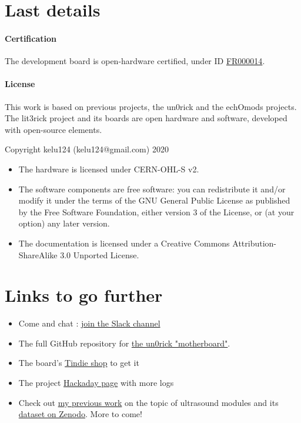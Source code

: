 \documentclass{article}
\begin{document}
 

\newpage \section{Last details}

\paragraph{Certification}

The development board is open-hardware certified, under ID \href{https://certification.oshwa.org/fr000014.html}{FR000014}.


\paragraph{License}

This work is based on previous projects, the un0rick and the echOmods projects. The lit3rick project and its boards are open hardware and software, developed with open-source elements.

Copyright kelu124 (kelu124@gmail.com) 2020

\begin{itemize}
\item The hardware is licensed under CERN-OHL-S v2.
\item The software components are free software: you can redistribute it and/or modify it under the terms of the GNU General Public License as published by the Free Software Foundation, either version 3 of the License, or (at your option) any later version.
\item The documentation is licensed under a Creative Commons Attribution-ShareAlike 3.0 Unported License.
\end{itemize}


\section{Links to go further}

\begin{itemize}
\item Come and chat : \href{https://join.slack.com/usdevkit/shared_invite/MTkxODU5MjU0NjI1LTE0OTY1ODgxMDEtMmYyZTliZDBlZA}{join the Slack channel} 
\item The full GitHub repository for \href{https://github.com/kelu124/un0rick}{the un0rick "motherboard"}.
\item The board’s \href{https://www.tindie.com/stores/kelu124/}{Tindie shop} to get it
\item The project \href{https://hackaday.io/project/28375-un0rick-an-ice40-ultrasound-board}{ Hackaday page} with more logs
\item Check out \href{https://openhardware.metajnl.com/articles/10.5334/joh.2/}{my previous work} on the topic of ultrasound modules \cite{kelu124} and its \href{http://doi.org/10.5281/zenodo.377054}{dataset on Zenodo}. More to come!

\end{itemize}
\end{document}
